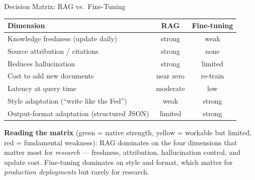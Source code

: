 \begin{frame}{Decision Matrix: RAG vs.\ Fine-Tuning}
\begin{center}
\renewcommand{\arraystretch}{1.35}
\small
\begin{tabular}{|p{4.6cm}|c|c|}
\hline
\textbf{Dimension} & \textbf{RAG} & \textbf{Fine-tuning} \\
\hline
Knowledge freshness (update daily) & \cellcolor{green!35}strong & \cellcolor{red!30}weak \\
\hline
Source attribution / citations & \cellcolor{green!35}strong & \cellcolor{red!30}none \\
\hline
Reduces hallucination & \cellcolor{green!35}strong & \cellcolor{yellow!45}limited \\
\hline
Cost to add new documents & \cellcolor{green!35}near zero & \cellcolor{red!30}re-train \\
\hline
Latency at query time & \cellcolor{yellow!45}moderate & \cellcolor{green!35}low \\
\hline
Style adaptation (``write like the Fed'') & \cellcolor{red!30}weak & \cellcolor{green!35}strong \\
\hline
Output-format adaptation (structured JSON) & \cellcolor{yellow!45}limited & \cellcolor{green!35}strong \\
\hline
\end{tabular}
\end{center}

\bigskip
\textbf{Reading the matrix} (green = native strength, yellow = workable but limited, red = fundamental weakness): RAG dominates on the four dimensions that matter most for \emph{research} --- freshness, attribution, hallucination control, and update cost. Fine-tuning dominates on style and format, which matter for \emph{production deployments} but rarely for research.
\end{frame}

